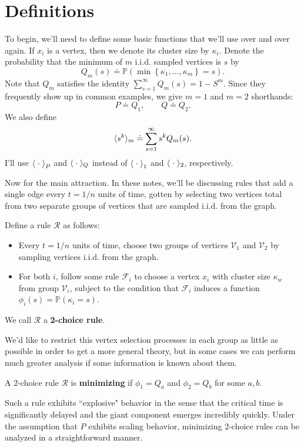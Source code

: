 \documentclass[twoside,10pt]{article}
\begin{document}
\tableofcontents

\section{Definitions}

To begin, we'll need to define some basic functions that we'll use over and over again. If $x_i$ is a vertex, then we denote its cluster size by $\kappa_i$. Denote the probability that the minimum of $m$ i.i.d. sampled vertices is $s$ by
\[
	Q_m(s) \doteq \mathbb{P}\left( \min\left\{ \kappa_1, \dots, \kappa_m \right\} = s \right) .
\] 
Note that $Q_m$ satisfies the identity $\sum_{s=1}^{\infty} Q_m(s) = 1-S^{m}$. Since they frequently show up in common examples, we give $m=1$ and $m=2$ shorthands:
\[
	P \doteq Q_1, \quad\quad Q \doteq Q_2.
\]
We also define
\[
	\langle s^{k} \rangle_{m} \doteq \sum_{s=1}^{\infty} s^{k} Q_m(s).
\] 
I'll use $\left\langle \;\cdot\; \right\rangle_{P}$ and $\langle \;\cdot\; \rangle_{Q}$ instead of $\left\langle \;\cdot\; \right\rangle_{1}$ and $\langle \;\cdot\; \rangle_{2}$, respectively.

Now for the main attraction. In these notes, we'll be discussing rules that add a single edge every $t=1/n$ units of time, gotten by selecting two vertices total from two separate groups of vertices that are sampled i.i.d. from the graph.

\begin{defn}[]
	Define a rule $\mathcal{R}$ as follows:
	\begin{itemize}
		\item Every $t=1/n$ units of time, choose two groups of vertices $\mathcal{V}_1$ and $\mathcal{V}_2$ by sampling vertices i.i.d. from the graph.
		\item For both $i$, follow some rule $\mathcal{F}_{i}$ to choose a vertex $x_i$ with cluster size $\kappa_w$ from group $\mathcal{V}_i$, subject to the condition that $\mathcal{F}_i$ induces a function $\phi_i(s) = \mathbb{P}\left( \kappa_i=s \right) $.
	\end{itemize}
We call $\mathcal{R}$ a \textbf{2-choice rule}.
\end{defn}
We'd like to restrict this vertex selection processes in each group as little as possible in order to get a more general theory, but in some cases we can perform much greater analysis if some information is known about them.

\begin{defn}[]
A 2-choice rule $\mathcal{R}$ is \textbf{minimizing} if $\phi_1 = Q_a$ and $\phi_2=Q_b$ for some $a,b$.
\end{defn}
Such a rule exhibits ``explosive" behavior in the sense that the critical time is significantly delayed and the giant component emerges incredibly quickly. Under the assumption that $P$ exhibits scaling behavior, minimizing 2-choice rules can be analyzed in a straightforward manner.
\end{document}
